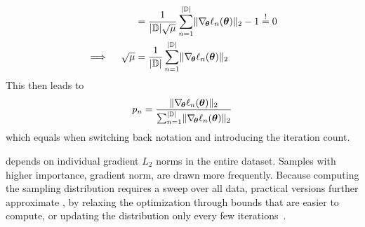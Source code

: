 {\begin{remark}
\begin{align*}
      &=
        \frac{1}{|{\mathbb{D}}| \sqrt{\mu}}
        \sum_{n=1}^{|{\mathbb{D}}|}
        \lVert \nabla_{\!{{\bm{\theta}}}}\ell_n({\bm{\theta}})\rVert_2
        - 1
        \overset{!}{=} 0
      \\
      \implies
      \quad
      \sqrt{\mu}
      &=
        \frac{1}{|{\mathbb{D}}|}
        \sum_{n=1}^{|{\mathbb{D}}|}
        \lVert \nabla_{\!{{\bm{\theta}}}}\ell_n({\bm{\theta}})\rVert_2
    \end{align*}
    This then leads to
    \begin{align*}
      {p}_n
      =
      \frac{
      \lVert \nabla_{\!{{\bm{\theta}}}}\ell_n({\bm{\theta}})\rVert_2
      }{
      \sum_{n=1}^{|{\mathbb{D}}|}
      \lVert \nabla_{\!{{\bm{\theta}}}}\ell_n({\bm{\theta}})\rVert_2
      }
    \end{align*}
    which equals 
    when switching back notation and introducing the iteration count.
  \end{remark}
} %
depends on individual gradient $L_2$ norms in the entire dataset. Samples with
higher importance, \ie gradient norm, are drawn more frequently. Because
computing the sampling distribution requires a sweep over all data, practical
versions further approximate
, \eg by relaxing the
optimization through bounds that are easier to compute, or updating the
distribution only every few iterations~\cite{katharopoulos2018samples}.

